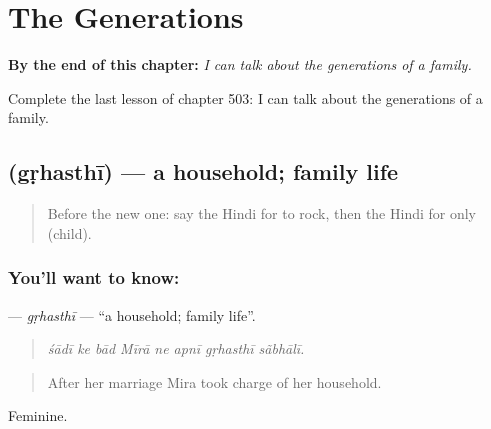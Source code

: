 
\chapter{The Generations}
\label{ch:hi-the-generations}

\begin{chapteropening}
\textbf{By the end of this chapter:} \emph{I can talk about the generations of a family.}

Complete the last lesson of chapter 503: I can talk about the generations of a family.
\end{chapteropening}

\section[\texorpdfstring{\hi{गृहस्थी} (gṛhasthī)}{गृहस्थी (gṛhasthī)}]{ (gṛhasthī) — a household; family life}

\label{lesson:HI-C503-grhasthi}



\begin{quote}
Before the new one: say the Hindi for to rock, then the Hindi for only (child).
\end{quote}

\subsection*{You'll want to know: }
\textbf{} — \emph{gṛhasthī} — \textquotedblleft{}a household; family life\textquotedblright{}.

\begin{quote}
       
\end{quote}

\begin{quote}
\emph{śādī ke bād Mīrā ne apnī gṛhasthī sãbhālī.}
\end{quote}

\begin{quote}
After her marriage Mira took charge of her household.
\end{quote}

Feminine.

